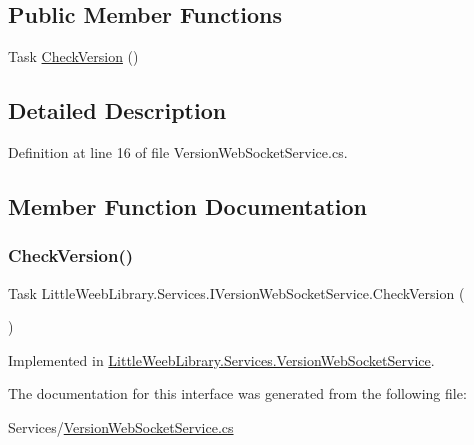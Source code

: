 \subsection*{Public Member Functions}
\begin{DoxyCompactItemize}
\item 
Task \mbox{\hyperlink{interface_little_weeb_library_1_1_services_1_1_i_version_web_socket_service_a8c4b2a561c8ddb900617466e83c0f957}{Check\+Version}} ()
\end{DoxyCompactItemize}


\subsection{Detailed Description}


Definition at line 16 of file Version\+Web\+Socket\+Service.\+cs.



\subsection{Member Function Documentation}
\mbox{\label{interface_little_weeb_library_1_1_services_1_1_i_version_web_socket_service_a8c4b2a561c8ddb900617466e83c0f957}} 
\subsubsection{\texorpdfstring{Check\+Version()}{CheckVersion()}}
{\footnotesize\ttfamily Task Little\+Weeb\+Library.\+Services.\+I\+Version\+Web\+Socket\+Service.\+Check\+Version (\begin{DoxyParamCaption}{ }\end{DoxyParamCaption})}



Implemented in \mbox{\hyperlink{class_little_weeb_library_1_1_services_1_1_version_web_socket_service_af1a64a24e2d1b2299b82ba81b3c4a537}{Little\+Weeb\+Library.\+Services.\+Version\+Web\+Socket\+Service}}.



The documentation for this interface was generated from the following file\+:\begin{DoxyCompactItemize}
\item 
Services/\mbox{\hyperlink{_version_web_socket_service_8cs}{Version\+Web\+Socket\+Service.\+cs}}\end{DoxyCompactItemize}
